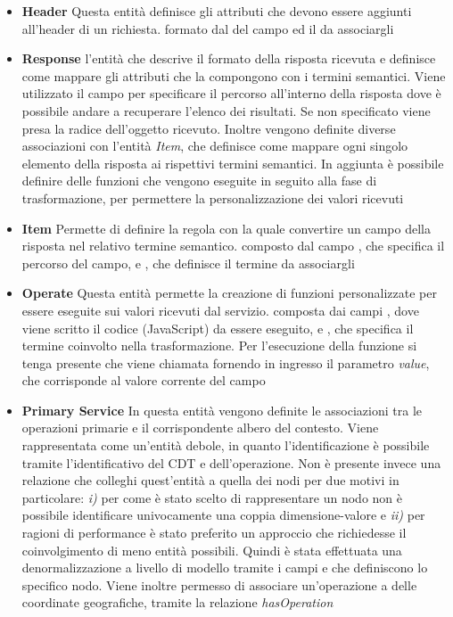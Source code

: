 \begin{itemize}
\begin{itemize}
	\end{itemize}
	\item \textbf{Header} Questa entità definisce gli attributi che devono essere aggiunti all'header di un richiesta. \upe formato dal  del campo ed il  da associargli
	\item \textbf{Response} \upe l'entità che descrive il formato della risposta ricevuta e definisce come mappare gli attributi che la compongono con i termini semantici. Viene utilizzato il campo  per specificare il percorso all'interno della risposta dove è possibile andare a recuperare l'elenco dei risultati. Se non specificato viene presa la radice dell'oggetto ricevuto. Inoltre vengono definite diverse associazioni con l'entità \emph{Item}, che definisce come mappare ogni singolo elemento della risposta ai rispettivi termini semantici. In aggiunta è possibile definire delle funzioni che vengono eseguite in seguito alla fase di trasformazione, per permettere la personalizzazione dei valori ricevuti
	\item \textbf{Item} Permette di definire la regola con la quale convertire un campo della risposta nel relativo termine semantico. \upe composto dal campo , che specifica il percorso del campo, e , che definisce il termine da associargli
	\item \textbf{Operate} Questa entità permette la creazione di funzioni personalizzate per essere eseguite sui valori ricevuti dal servizio. \upe composta dai campi , dove viene scritto il codice (JavaScript) da essere eseguito, e , che specifica il termine coinvolto nella trasformazione. Per l'esecuzione della funzione si tenga presente che viene chiamata fornendo in ingresso il parametro \emph{value}, che corrisponde al valore corrente del campo
	\item \textbf{Primary Service} In questa entità vengono definite le associazioni tra le operazioni primarie e il corrispondente albero del contesto. Viene rappresentata come un'entità debole, in quanto l'identificazione è possibile tramite l'identificativo del CDT e dell'operazione. Non è presente invece una relazione che colleghi quest'entità a quella dei nodi per due motivi in particolare: \emph{i)} per come è stato scelto di rappresentare un nodo non è possibile identificare univocamente una coppia dimensione-valore e \emph{ii)} per ragioni di performance è stato preferito un approccio che richiedesse il coinvolgimento di meno entità possibili. Quindi è stata effettuata una denormalizzazione a livello di modello tramite i campi  e  che definiscono lo specifico nodo. Viene inoltre permesso di associare un'operazione a delle coordinate geografiche, tramite la relazione \emph{hasOperation}

\end{itemize}
